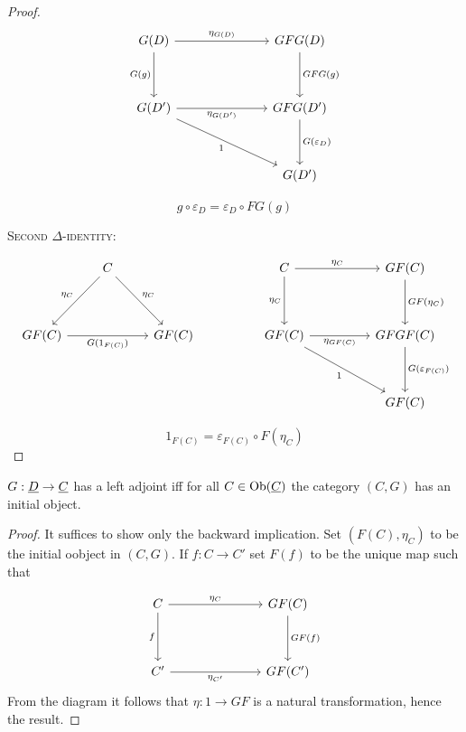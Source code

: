 \begin{proof}
	\[
		\begin{tikzcd}{G(D)} &&& {GFG(D)} \\
			\\
			{G(D')} &&& {GFG(D')} \\
			\\
			&&& {G(D')}
			\arrow["{\eta_{G(D)}}", from=1-1, to=1-4]
			\arrow["{G(g)}"', from=1-1, to=3-1]
			\arrow["{GFG(g)}", from=1-4, to=3-4]
			\arrow["{\eta_{G(D')}}"', from=3-1, to=3-4]
			\arrow["1"', from=3-1, to=5-4]
			\arrow["{G(\varepsilon_D)}", from=3-4, to=5-4]
		\end{tikzcd}
	\]

	\[
		g \circ \varepsilon_D = \varepsilon_D \circ FG(g)
	\]

	\vspace*{3mm}

	\textsc{Second \( \Delta \)-identity}:

	\vspace*{3mm}

	\[
		\begin{tikzcd}
			& C &&& C && {GF(C)} \\
			\\
			{GF(C)} && {GF(C)} && {GF(C)} && {GFGF(C)} \\
			\\
			&&&&&& {GF(C)}
			\arrow["{\eta_C}"', from=1-2, to=3-1]
			\arrow["{\eta_C}", from=1-2, to=3-3]
			\arrow["{\eta_C}", from=1-5, to=1-7]
			\arrow["{\eta_C}"', from=1-5, to=3-5]
			\arrow["{GF(\eta_C)}", from=1-7, to=3-7]
			\arrow["{G(1_{F(C)})}"', from=3-1, to=3-3]
			\arrow["{\eta_{GF(C)}}"', from=3-5, to=3-7]
			\arrow["1"', from=3-5, to=5-7]
			\arrow["{G(\varepsilon_{F(C)})}", from=3-7, to=5-7]
		\end{tikzcd}
	\]

	\[
		1_{F(C)} = \varepsilon_{F(C)} \circ F(\eta_C)
	\]
\end{proof}

\begin{corollary*}
	\( G: \underline{D} \to \underline{C} \) has a left adjoint iff for all \( C \in \operatorname{Ob}(\underline{C}) \) the category \( (C \comma G) \) has an initial object.
\end{corollary*}
\begin{proof}
	It suffices to show only the backward implication. Set \( (F(C), \eta_C) \) to be the initial oobject in \( (C \comma G) \). If \( f: C \to C' \) set \( F(f) \) to be the unique map such that

	\[
		\begin{tikzcd}
			C &&& {GF(C)} \\
			\\
			{C'} &&& {GF(C')}
			\arrow["{\eta_C}", from=1-1, to=1-4]
			\arrow["f"', from=1-1, to=3-1]
			\arrow["{GF(f)}", from=1-4, to=3-4]
			\arrow["{\eta_{C'}}"', from=3-1, to=3-4]
		\end{tikzcd}
	\]
	From the diagram it follows that \( \eta: 1 \to GF \) is a natural transformation, hence the result.
\end{proof}

